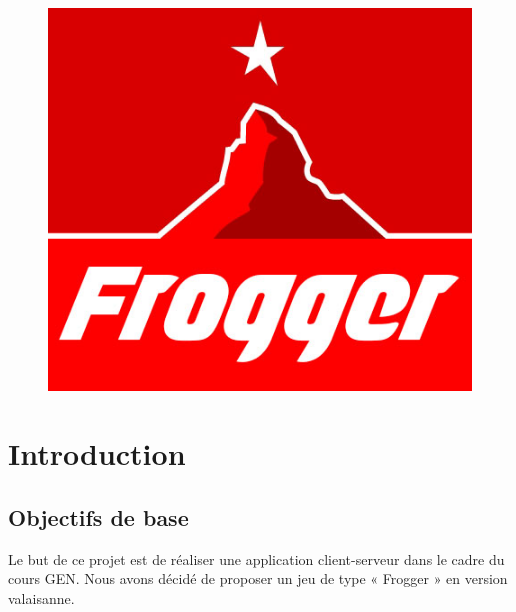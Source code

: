 \documentclass[a4paper,11pt]{article}
\author{\auteur}
\title{\titre}
\date{\today}
\begin{document}
\clearpage\maketitle
\thispagestyle{empty}

	\maketitle
	\begin{figure}[h!]
		\centering
		\includegraphics[scale=0.7]{../Logo/logo.jpg}
	\end{figure}
	\newpage


	\tableofcontents

	\newpage

	\section{Introduction}
	\subsection{Objectifs de base}
	Le but de ce projet est de réaliser une application client-serveur dans le cadre du cours GEN. Nous avons décidé de proposer un jeu de type « Frogger » en version valaisanne. \par
\end{document}
